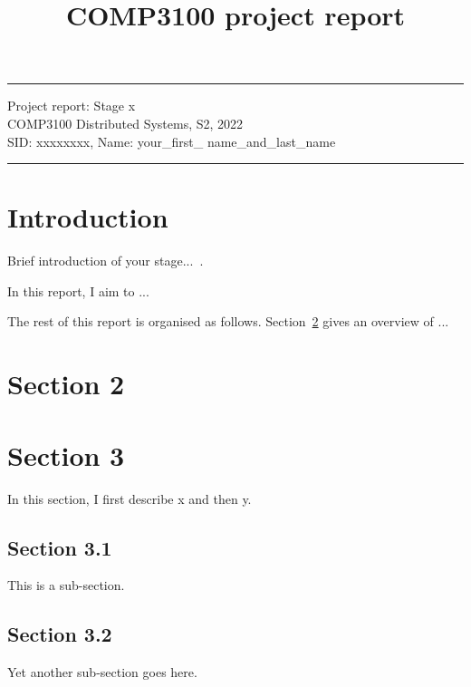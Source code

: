 \documentclass[a4paper]{article} %
\begin{document}

\title{COMP3100 project report} %
\fancyhead[C]{}
\hrule \medskip %
\begin{minipage}{1\textwidth} %
\centering 
\large %
Project report: Stage x\\ %
COMP3100 Distributed Systems, S2, 2022\\
\normalsize %
SID: xxxxxxxx, Name: your\_first\_ name\_and\_last\_name
\end{minipage}
\medskip\hrule %
\bigskip

\section{Introduction}
Brief introduction of your stage...~\cite{mesos2011}.

In this report, I aim to ...

The rest of this report is organised as follows. Section~\ref{sec:section2} gives an overview of ...

\section{Section 2}
\label{sec:section2}

\section{Section 3}
\label{sec:section3}
In this section, I first describe x and then y.

\subsection{Section 3.1}
This is a sub-section.

\subsection{Section 3.2}
Yet another sub-section goes here.
\end{document}
